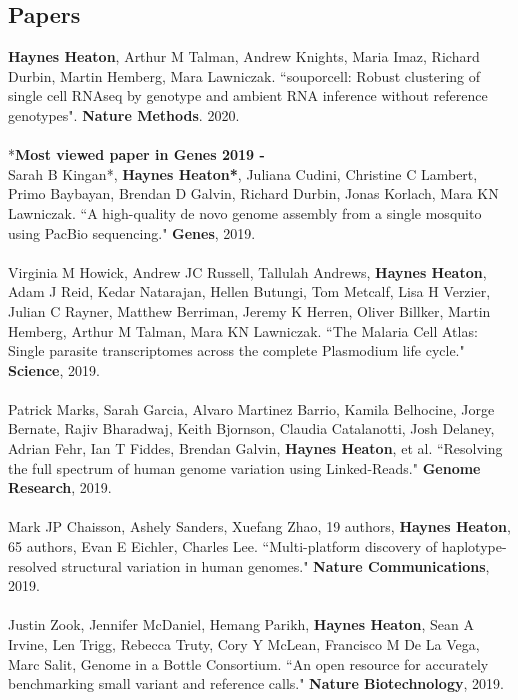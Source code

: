 \documentclass[10pt]{res}
\begin{document}
\begin{resume}
\section{Papers}
\textbf{Haynes Heaton}, Arthur M Talman, Andrew Knights, Maria Imaz, Richard Durbin, Martin Hemberg, Mara Lawniczak. ``souporcell: Robust clustering of single cell RNAseq by genotype and ambient RNA inference without reference genotypes". \textbf{Nature Methods}. 2020. \\ \\
*\textbf{Most viewed paper in Genes 2019 -} \\
Sarah B Kingan*, \textbf{Haynes Heaton*}, Juliana Cudini, Christine C Lambert, Primo Baybayan, Brendan D Galvin, Richard Durbin, Jonas Korlach, Mara KN Lawniczak. ``A high-quality de novo genome assembly from a single mosquito using PacBio sequencing." \textbf{Genes}, 2019.
\\ \\
Virginia M Howick, Andrew JC Russell, Tallulah Andrews, \textbf{Haynes Heaton}, Adam J Reid, Kedar Natarajan, Hellen Butungi, Tom Metcalf, Lisa H Verzier, Julian C Rayner, Matthew Berriman, Jeremy K Herren, Oliver Billker, Martin Hemberg, Arthur M Talman, Mara KN Lawniczak. ``The Malaria Cell Atlas: Single parasite transcriptomes across the complete Plasmodium life cycle." \textbf{Science}, 2019.
\\ \\
Patrick Marks, Sarah Garcia, Alvaro Martinez Barrio, Kamila Belhocine, Jorge Bernate, Rajiv Bharadwaj, Keith Bjornson, Claudia Catalanotti, Josh Delaney, Adrian Fehr, Ian T Fiddes, Brendan Galvin, \textbf{Haynes Heaton}, et al. ``Resolving the full spectrum of human genome variation using Linked-Reads." \textbf{Genome Research}, 2019.
\\ \\
Mark JP Chaisson, Ashely Sanders, Xuefang Zhao, 19 authors, \textbf{Haynes Heaton}, 65 authors, Evan E Eichler, Charles Lee. ``Multi-platform discovery of haplotype-resolved structural variation in human genomes." \textbf{Nature Communications}, 2019.
\\ \\
Justin Zook, Jennifer McDaniel, Hemang Parikh, \textbf{Haynes Heaton}, Sean A Irvine, Len Trigg, Rebecca Truty, Cory Y McLean, Francisco M De La Vega, Marc Salit, Genome in a Bottle Consortium. ``An open resource for accurately benchmarking small variant and reference calls."  \textbf{Nature Biotechnology}, 2019.
\\ \\

\end{resume}
\end{document}
